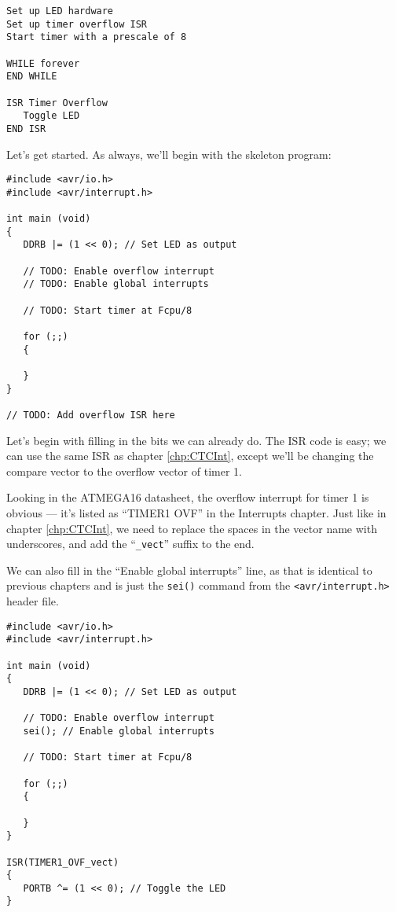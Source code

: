 \documentclass[a4paper,oneside]{book}
\begin{document}
\begin{center}
\begin{lstlisting}[keywordstyle=\color{black},commentstyle=\color{black}]
Set up LED hardware
Set up timer overflow ISR
Start timer with a prescale of 8

WHILE forever
END WHILE

ISR Timer Overflow
   Toggle LED
END ISR 
\end{lstlisting}
\end{center}

Let's get started. As always, we'll begin with the skeleton program: 

\begin{center}
\begin{lstlisting}
#include <avr/io.h>
#include <avr/interrupt.h>

int main (void)
{
   DDRB |= (1 << 0); // Set LED as output

   // TODO: Enable overflow interrupt
   // TODO: Enable global interrupts

   // TODO: Start timer at Fcpu/8

   for (;;)
   {

   }
}

// TODO: Add overflow ISR here 
\end{lstlisting}
\end{center}

Let's begin with filling in the bits we can already do. The ISR code is easy; we can use the same ISR as chapter \ref{chp:CTCInt}, except we'll be changing the compare vector to the overflow vector of timer 1.

Looking in the ATMEGA16 datasheet, the overflow interrupt for timer 1 is obvious --- it's listed as ``TIMER1 OVF'' in the Interrupts chapter. Just like in chapter \ref{chp:CTCInt}, we need to replace the spaces in the vector name with underscores, and add the ``\texttt{\_vect}'' suffix to the end.

We can also fill in the ``Enable global interrupts'' line, as that is identical to previous chapters and is just the \texttt{sei()} command from the \texttt{<avr/interrupt.h>} header file.

\begin{center}
\begin{lstlisting}
#include <avr/io.h>
#include <avr/interrupt.h>

int main (void)
{
   DDRB |= (1 << 0); // Set LED as output

   // TODO: Enable overflow interrupt
   sei(); // Enable global interrupts

   // TODO: Start timer at Fcpu/8

   for (;;)
   {

   }
}

ISR(TIMER1_OVF_vect)
{
   PORTB ^= (1 << 0); // Toggle the LED
} 
\end{lstlisting}
\end{center}
\end{document}
